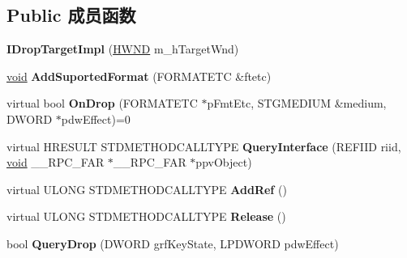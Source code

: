 \subsection*{Public 成员函数}
\begin{DoxyCompactItemize}
\item 
\mbox{\label{class_i_drop_target_impl_aa2d317c15e03acce42497980c139c019}} 
{\bfseries I\+Drop\+Target\+Impl} (\hyperlink{interfacevoid}{H\+W\+ND} m\+\_\+h\+Target\+Wnd)
\item 
\mbox{\label{class_i_drop_target_impl_a9a01aab5d984f1cf5b7b5c360047db49}} 
\hyperlink{interfacevoid}{void} {\bfseries Add\+Suported\+Format} (F\+O\+R\+M\+A\+T\+E\+TC \&ftetc)
\item 
\mbox{\label{class_i_drop_target_impl_a7f770b766e36cb6c0c96788f5054cf6b}} 
virtual bool {\bfseries On\+Drop} (F\+O\+R\+M\+A\+T\+E\+TC $\ast$p\+Fmt\+Etc, S\+T\+G\+M\+E\+D\+I\+UM \&medium, D\+W\+O\+RD $\ast$pdw\+Effect)=0
\item 
\mbox{\label{class_i_drop_target_impl_a78b6a948ba316f24385866810d9aa691}} 
virtual H\+R\+E\+S\+U\+LT S\+T\+D\+M\+E\+T\+H\+O\+D\+C\+A\+L\+L\+T\+Y\+PE {\bfseries Query\+Interface} (R\+E\+F\+I\+ID riid, \hyperlink{interfacevoid}{void} \+\_\+\+\_\+\+R\+P\+C\+\_\+\+F\+AR $\ast$\+\_\+\+\_\+\+R\+P\+C\+\_\+\+F\+AR $\ast$ppv\+Object)
\item 
\mbox{\label{class_i_drop_target_impl_ae5d918f8f9dcdb0ab80ee09e002b22a5}} 
virtual U\+L\+O\+NG S\+T\+D\+M\+E\+T\+H\+O\+D\+C\+A\+L\+L\+T\+Y\+PE {\bfseries Add\+Ref} ()
\item 
\mbox{\label{class_i_drop_target_impl_af659897d5653e6c1fd59b533f71c1c2c}} 
virtual U\+L\+O\+NG S\+T\+D\+M\+E\+T\+H\+O\+D\+C\+A\+L\+L\+T\+Y\+PE {\bfseries Release} ()
\item 
\mbox{\label{class_i_drop_target_impl_a24503f241509218b6564f70acac88467}} 
bool {\bfseries Query\+Drop} (D\+W\+O\+RD grf\+Key\+State, L\+P\+D\+W\+O\+RD pdw\+Effect)
\item 
\mbox{\label{class_i_drop_target_impl_a117c5b7ae0cf595b6a9e6fdc48220462}} 

\end{DoxyCompactItemize}
